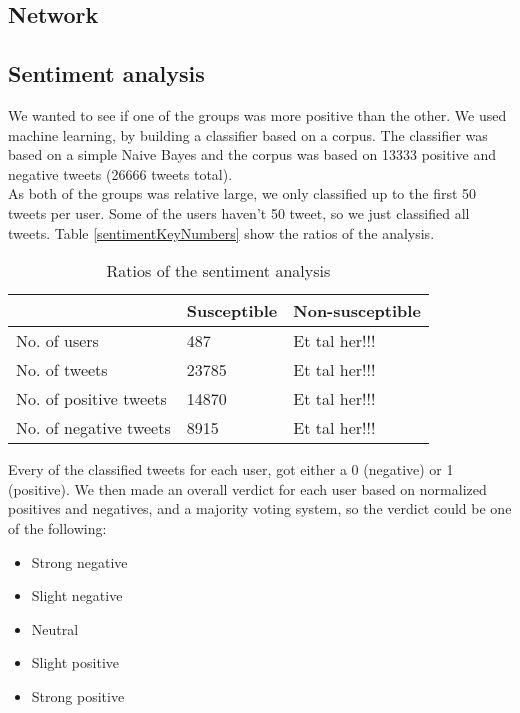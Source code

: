 \documentclass[10pt]{IEEEtran}
\begin{document}
\subsection{Network}
\subsection{Sentiment analysis}
We wanted to see if one of the groups was more positive than the other. We used machine learning, by building a classifier based on a corpus. The classifier was based on a simple Naive Bayes and the corpus was based on 13333 positive and negative tweets (26666 tweets total). \\
As both of the groups was relative large, we only classified up to the first 50 tweets per user. Some of the users haven't 50 tweet, so we just classified all tweets. 
Table \ref{sentimentKeyNumbers} show the ratios of the analysis. 

\begin{table}[ht]
\centering
\begin{tabular}{lll}
\hline
                       & Susceptible & Non-susceptible \\ \hline
No. of users           & 487         & Et tal her!!!   \\
No. of tweets          & 23785       & Et tal her!!!   \\
No. of positive tweets & 14870       & Et tal her!!!   \\
No. of negative tweets & 8915        & Et tal her!!!   \\ \hline
\end{tabular}
\caption{Ratios of the sentiment analysis}
\label{tab:sentimentKeyNumbers}
\end{table}

Every of the classified tweets for each user, got either a 0 (negative) or 1 (positive). We then made an overall verdict for each user based on normalized positives and negatives, and a majority voting system, so the verdict could be one of the following:

\begin{itemize}
  \item Strong negative
  \item Slight negative
  \item Neutral
  \item Slight positive
  \item Strong positive\\
\end{itemize}
\end{document}

